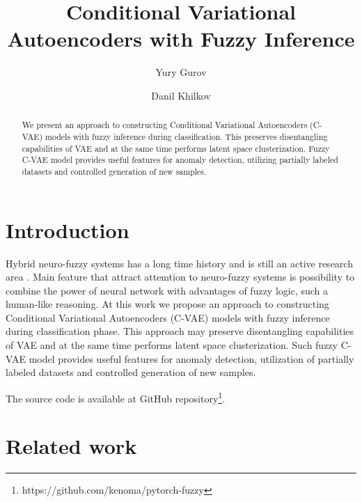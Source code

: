 \documentclass[runningheads]{llncs}
\begin{document}
%
\title{Conditional Variational Autoencoders with Fuzzy Inference}
%
\author{Yury Gurov \and
Danil Khilkov}
%
%
\maketitle              
%
\begin{abstract}
We present an approach to constructing Conditional Variational Autoencoders (C-VAE) models with fuzzy inference during classification.
This preserves disentangling capabilities of VAE and at the same time performs latent space clusterization.
Fuzzy C-VAE model provides useful features for anomaly detection, utilizing partially labeled datasets and controlled generation of new samples.
%
\end{abstract}
%
%
%
\section{Introduction}

Hybrid neuro-fuzzy systems has a long time history and is still an active research area \cite{DECAMPOSSOUZA2020106275}.
Main feature that attract attemtion to neuro-fuzzy systems is possibility to combine the power of neural network with advantages of fuzzy logic, such a human-like reasoning.
At this work we propose an approach to constructing Conditional Variational Autoencoders (C-VAE) \cite{kingma2022autoencoding,Kingma_2019,SohnCVAE} models with fuzzy inference during classification phase.
This approach may preserve disentangling capabilities of VAE and at the same time performs latent space clusterization.
Such fuzzy C-VAE model provides useful features for anomaly detection, utilization of partially labeled datasets and controlled generation of new samples.

The source code is available at GitHub repository\footnote{https://github.com/kenoma/pytorch-fuzzy}.

\section{Related work}
\end{document}
